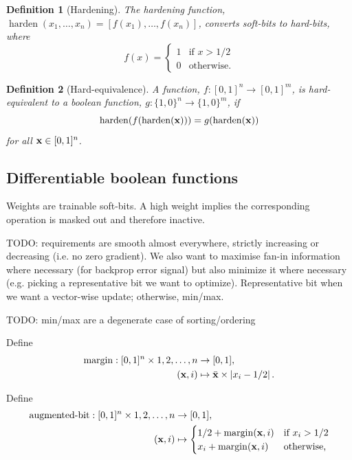 \documentclass{article} %
\newtheorem*{definition}{Definition}
\begin{document}
\begin{definition}[Hardening]
The {\em hardening} function, $\operatorname{harden}(x_{1}, \dots, x_{n}) = [f(x_{1}), \dots, f(x_{n})]$, converts soft-bits to hard-bits, where
\begin{equation*}
f(x) =
\begin{cases}
1 & \text{if } x > 1/2 \\
0 & \text{otherwise.}
\end{cases}
\end{equation*}
\end{definition}

\begin{definition}[Hard-equivalence]
	A function, $f: [0,1]^n \rightarrow [0,1]^m$, is {\em hard-equivalent} to a boolean function, $g: \{1,0\}^n \rightarrow \{1,0\}^m$,	if
	\begin{equation*}
	\operatorname{harden}(f(\operatorname{harden}({\bf x}))) = g(\operatorname{harden}({\bf x}))
	\end{equation*}
for all ${\bf x} \in [0,1]^{n}$.
\end{definition}

\subsection{Differentiable boolean functions}

Weights are trainable soft-bits. A high weight implies the corresponding operation is masked out and therefore inactive.

TODO: requirements are smooth almost everywhere, strictly increasing or decreasing (i.e. no zero gradient). We also want to maximise fan-in information where necessary (for backprop error signal) but also minimize it where necessary (e.g. picking a representative bit we want to optimize). Representative bit when we want a vector-wise update; otherwise, min/max.

TODO: min/max are a degenerate case of sorting/ordering

Define 
\begin{equation*}
\begin{aligned}
\operatorname{margin}: [0,1]^{n} \times 1,2,\dots,n &\to [0,1],\\
({\bf x}, i) &\mapsto \bar{\bf x} \times \left|x_{i} - 1/2\right| \text{.}
\end{aligned}
\end{equation*}

Define 
\begin{equation*}
\begin{aligned}
\operatorname{augmented-bit}: [0,1]^{n} \times 1,2,\dots,n &\to [0,1],\\
({\bf x}, i) &\mapsto 
\begin{cases}
1/2 + \operatorname{margin}({\bf x}, i) & \text{if } x_{i} > 1/2 \\
x_{i} + \operatorname{margin}({\bf x}, i) & \text{otherwise,}
\end{cases}
\end{aligned}
\end{equation*}
\end{document}
